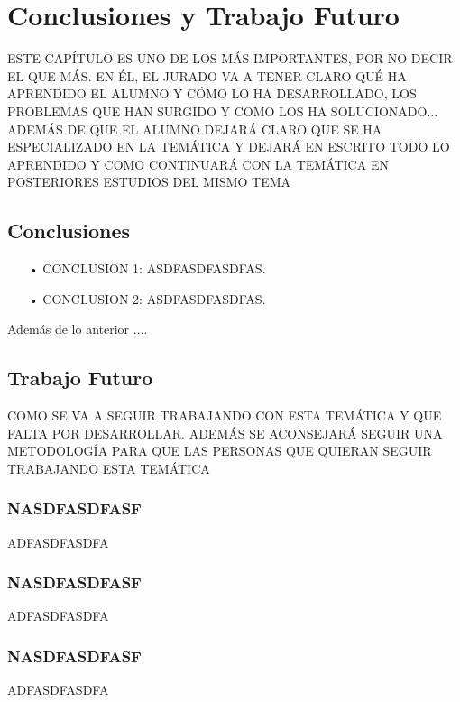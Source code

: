 \chapter{Conclusiones y Trabajo Futuro}
ESTE CAPÍTULO ES UNO DE LOS MÁS IMPORTANTES, POR NO DECIR EL QUE MÁS. EN ÉL, EL JURADO VA A TENER CLARO QUÉ HA APRENDIDO EL ALUMNO Y CÓMO LO HA DESARROLLADO, LOS PROBLEMAS QUE HAN SURGIDO Y COMO LOS HA SOLUCIONADO...
ADEMÁS DE QUE EL ALUMNO DEJARÁ CLARO QUE SE HA ESPECIALIZADO EN LA TEMÁTICA Y DEJARÁ EN ESCRITO TODO LO APRENDIDO Y COMO CONTINUARÁ CON LA TEMÁTICA EN POSTERIORES ESTUDIOS DEL MISMO TEMA

\section{Conclusiones}


\begin{itemize}

\item[•] CONCLUSION 1: ASDFASDFASDFAS.
\item[•] CONCLUSION 2: ASDFASDFASDFAS. 

\end{itemize}
Además de lo anterior ....

\section{Trabajo Futuro}
COMO SE VA A SEGUIR TRABAJANDO CON ESTA TEMÁTICA Y QUE FALTA POR DESARROLLAR. ADEMÁS SE ACONSEJARÁ SEGUIR UNA METODOLOGÍA PARA QUE LAS PERSONAS QUE QUIERAN SEGUIR TRABAJANDO ESTA TEMÁTICA

\subsection*{NASDFASDFASF}
ADFASDFASDFA

\subsection*{NASDFASDFASF}
ADFASDFASDFA

\subsection*{NASDFASDFASF}
ADFASDFASDFA

